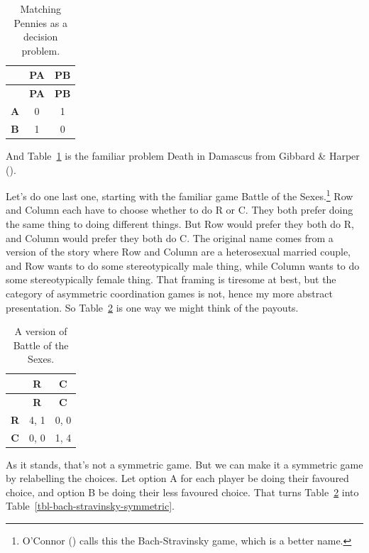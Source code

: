 \documentclass[
  12pt,
  letterpaper,
  DIV=11,
  numbers=noendperiod]{scrreprt}
\begin{document}
\begin{longtable}[]{@{}ccc@{}}
\caption{Matching Pennies as a decision
problem.}\label{tbl-death-in-damascus}\tabularnewline
\toprule\noalign{}
& \textbf{PA} & \textbf{PB} \\
\midrule\noalign{}
\endfirsthead
\toprule\noalign{}
& \textbf{PA} & \textbf{PB} \\
\midrule\noalign{}
\endhead
\bottomrule\noalign{}
\endlastfoot
\textbf{A} & 0 & 1 \\
\textbf{B} & 1 & 0 \\
\end{longtable}

And Table~\ref{tbl-death-in-damascus} is the familiar problem Death in
Damascus from Gibbard \& Harper
().

Let's do one last one, starting with the familiar game Battle of the
Sexes.\footnote{O'Connor () calls this
  the Bach-Stravinsky game, which is a better name.} Row and Column each
have to choose whether to do R or C. They both prefer doing the same
thing to doing different things. But Row would prefer they both do R,
and Column would prefer they both do C. The original name comes from a
version of the story where Row and Column are a heterosexual married
couple, and Row wants to do some stereotypically male thing, while
Column wants to do some stereotypically female thing. That framing is
tiresome at best, but the category of asymmetric coordination games is
not, hence my more abstract presentation. So
Table~\ref{tbl-bach-stravinsky} is one way we might think of the
payouts.

\begin{longtable}[]{@{}ccc@{}}
\caption{A version of Battle of the
Sexes.}\label{tbl-bach-stravinsky}\tabularnewline
\toprule\noalign{}
& \textbf{R} & \textbf{C} \\
\midrule\noalign{}
\endfirsthead
\toprule\noalign{}
& \textbf{R} & \textbf{C} \\
\midrule\noalign{}
\endhead
\bottomrule\noalign{}
\endlastfoot
\textbf{R} & 4, 1 & 0, 0 \\
\textbf{C} & 0, 0 & 1, 4 \\
\end{longtable}

As it stands, that's not a symmetric game. But we can make it a
symmetric game by relabelling the choices. Let option A for each player
be doing their favoured choice, and option B be doing their less
favoured choice. That turns Table~\ref{tbl-bach-stravinsky} into
Table~\ref{tbl-bach-stravinsky-symmetric}.
\end{document}
